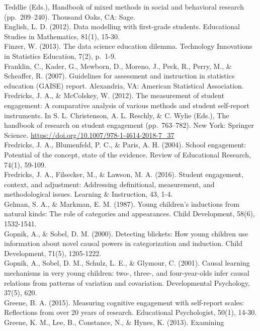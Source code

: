 \documentclass[]{book}
\theoremstyle{definition}
\theoremstyle{definition}
\theoremstyle{definition}
\theoremstyle{remark}
\begin{document}
Teddlie (Eds.), Handbook of mixed methods in social and behavioral
research (pp.~209--240). Thousand Oaks, CA: Sage.\\
English, L. D. (2012). Data modelling with first-grade students.
Educational Studies in Mathematics, 81(1), 15-30.\\
Finzer, W. (2013). The data science education dilemma. Technology
Innovations in Statistics Education, 7(2), p.~1-9.\\
Franklin, C., Kader, G., Mewborn, D., Moreno, J., Peck, R., Perry, M.,
\& Scheaffer, R. (2007). Guidelines for assessment and instruction in
statistics education (GAISE) report. Alexandria, VA: American
Statistical Association.\\
Fredricks, J. A., \& McColskey, W. (2012). The measurement of student
engagement: A comparative analysis of various methods and student
self-report instruments. In S. L. Christenson, A. L. Reschly, \& C.
Wylie (Eds.), The handbook of research on student engagement
(pp.~763--782). New York: Springer Science.
\url{https://doi.org/10.1007/978-1-4614-2018-7_37}\\
Fredricks, J. A., Blumenfeld, P. C., \& Paris, A. H. (2004). School
engagement: Potential of the concept, state of the evidence. Review of
Educational Research, 74(1), 59-109.\\
Fredricks, J. A., Filsecker, M., \& Lawson, M. A. (2016). Student
engagement, context, and adjustment: Addressing definitional,
measurement, and methodological issues. Learning \& Instruction, 43,
1-4.\\
Gelman, S. A., \& Markman, E. M. (1987). Young children's inductions
from natural kinds: The role of categories and appearances. Child
Development, 58(6), 1532-1541.\\
Gopnik, A., \& Sobel, D. M. (2000). Detecting blickets: How young
children use information about novel causal powers in categorization and
induction. Child Development, 71(5), 1205-1222.\\
Gopnik, A., Sobel, D. M., Schulz, L. E., \& Glymour, C. (2001). Causal
learning mechanisms in very young children: two-, three-, and
four-year-olds infer causal relations from patterns of variation and
covariation. Developmental Psychology, 37(5), 620.\\
Greene, B. A. (2015). Measuring cognitive engagement with self-report
scales: Reflections from over 20 years of research. Educational
Psychologist, 50(1), 14-30.\\
Greene, K. M., Lee, B., Constance, N., \& Hynes, K. (2013). Examining
\end{document}
